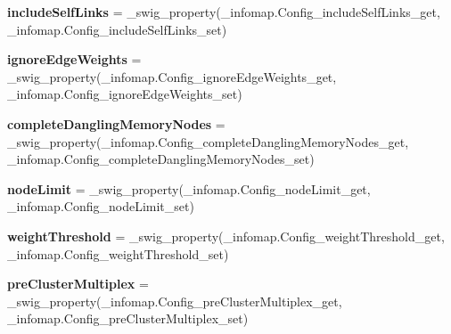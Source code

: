 \begin{DoxyCompactItemize}
\item 
\mbox{\label{classdsmacc_1_1graph_1_1infomap_1_1infomap_1_1Config_a07df9e8a6f107583573372957f67c9e2}} 
{\bfseries include\+Self\+Links} = \+\_\+swig\+\_\+property(\+\_\+infomap.\+Config\+\_\+include\+Self\+Links\+\_\+get, \+\_\+infomap.\+Config\+\_\+include\+Self\+Links\+\_\+set)
\item 
\mbox{\label{classdsmacc_1_1graph_1_1infomap_1_1infomap_1_1Config_ae6f2d7aa5abd048c091afb307f3d1f66}} 
{\bfseries ignore\+Edge\+Weights} = \+\_\+swig\+\_\+property(\+\_\+infomap.\+Config\+\_\+ignore\+Edge\+Weights\+\_\+get, \+\_\+infomap.\+Config\+\_\+ignore\+Edge\+Weights\+\_\+set)
\item 
\mbox{\label{classdsmacc_1_1graph_1_1infomap_1_1infomap_1_1Config_a5db77486485de6989af805aec5d5284c}} 
{\bfseries complete\+Dangling\+Memory\+Nodes} = \+\_\+swig\+\_\+property(\+\_\+infomap.\+Config\+\_\+complete\+Dangling\+Memory\+Nodes\+\_\+get, \+\_\+infomap.\+Config\+\_\+complete\+Dangling\+Memory\+Nodes\+\_\+set)
\item 
\mbox{\label{classdsmacc_1_1graph_1_1infomap_1_1infomap_1_1Config_aeecfd5b4cba92104d421407a3ca4551a}} 
{\bfseries node\+Limit} = \+\_\+swig\+\_\+property(\+\_\+infomap.\+Config\+\_\+node\+Limit\+\_\+get, \+\_\+infomap.\+Config\+\_\+node\+Limit\+\_\+set)
\item 
\mbox{\label{classdsmacc_1_1graph_1_1infomap_1_1infomap_1_1Config_a2b7c152d2041300022348a4db254b96b}} 
{\bfseries weight\+Threshold} = \+\_\+swig\+\_\+property(\+\_\+infomap.\+Config\+\_\+weight\+Threshold\+\_\+get, \+\_\+infomap.\+Config\+\_\+weight\+Threshold\+\_\+set)
\item 
\mbox{\label{classdsmacc_1_1graph_1_1infomap_1_1infomap_1_1Config_abbe0479311e544b6d4d5b8996fa6d2dc}} 
{\bfseries pre\+Cluster\+Multiplex} = \+\_\+swig\+\_\+property(\+\_\+infomap.\+Config\+\_\+pre\+Cluster\+Multiplex\+\_\+get, \+\_\+infomap.\+Config\+\_\+pre\+Cluster\+Multiplex\+\_\+set)
\item 

\end{DoxyCompactItemize}
